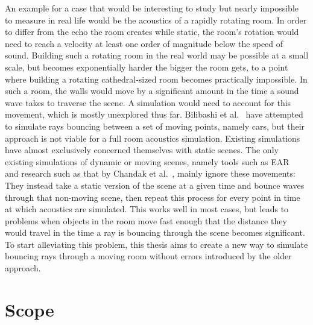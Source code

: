 An example for a case that would be interesting to study but nearly impossible to measure in real life
would be the acoustics of a rapidly rotating room.
In order to differ from the echo the room creates while static,
the room's rotation would need to reach a velocity at least one order of magnitude below the speed of sound.
Building such a rotating room in the real world may be possible at a small scale,
but becomes exponentially harder the bigger the room gets,
to a point where building a rotating cathedral-sized room becomes practically impossible.
\newline
In such a room, the walls would move by a significant amount in the time a sound wave takes to traverse the scene.
A simulation would need to account for this movement, which is mostly unexplored thus far.
Bilibashi et al.~\cite{BVD20} have attempted to simulate rays bouncing between a set of moving points, namely cars,
but their approach is not viable for a full room acoustics simulation.
\newline
Existing simulations have almost exclusively concerned themselves with static scenes.
The only existing simulations of dynamic or moving scenes,
namely tools such as EAR~\cite{Kr17} and research such as that by Chandak et al.~\cite{Cha08},
mainly ignore these movements:
They instead take a static version of the scene at a given time and bounce waves through that non-moving scene,
then repeat this process for every point in time at which acoustics are simulated.
\newline
This works well in most cases, but leads to problems when objects in the room move fast enough
that the distance they would travel in the time a ray is bouncing through the scene becomes significant.
To start alleviating this problem,
this thesis aims to create a new way to simulate bouncing rays through a moving room without errors introduced by the older approach.

\section{Scope}\label{sec:Scope}

